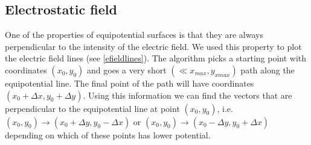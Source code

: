 \documentclass[aps,twocolumn,pre,nofootinbib,10pt]{revtex4-1}
\begin{document}
\subsection{Electrostatic field}
One of the properties of equipotential surfaces is that they are always perpendicular to the intensity of the electric field. We used this property to plot the electric field lines (see \ref{efieldlines}). The algorithm picks a starting point with coordinates \begin{math} (x_0,y_0) \end{math} and goes a very short \begin{math} (\ll x_{max},y_{xmax})\end{math} path along the equipotential line. The final point of the path will have coordinates \begin{math} (x_0+\Delta x, y_0 + \Delta y)\end{math}. Using this information we can find the vectors that are perpendicular to the equipotential line at point \begin{math} (x_0,y_0) \end{math}, i.e. \begin{math} (x_0,y_0) \rightarrow (x_0 + \Delta y, y_0 - \Delta x) \end{math} or \begin{math} (x_0,y_0) \rightarrow (x_0 - \Delta y, y_0 + \Delta x) \end{math} depending on which of these points has lower potential.
\end{document}
